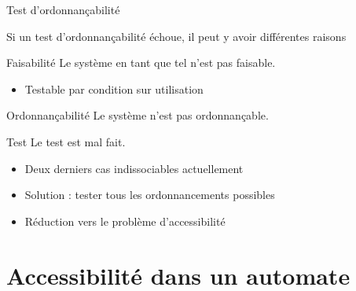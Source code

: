 \documentclass{bredelebeamer}
\begin{document}
\begin{frame}{Test d'ordonnançabilité}

Si un test d'ordonnançabilité échoue, il peut y avoir différentes raisons
\begin{exampleblock}{Faisabilité}
Le système en tant que tel n'est pas faisable.
\begin{itemize}
\item Testable par condition sur utilisation
\end{itemize}
\end{exampleblock}

\begin{block}{Ordonnançabilité}
Le système n'est pas ordonnançable.
\end{block}

\begin{alertblock}{Test}
Le test est mal fait.
\end{alertblock}

\begin{itemize}
\item Deux derniers cas indissociables actuellement
\item Solution : tester tous les ordonnancements possibles
\item Réduction vers le problème d'accessibilité
\end{itemize}



\end{frame}

\section[Accessibilité]{Accessibilité dans un automate}
\end{document}
